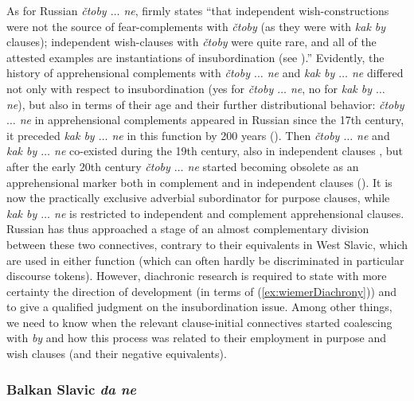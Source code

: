 \documentclass[output=paper,colorlinks,citecolor=brown]{langscibook}
\begin{document}
 As for Russian \textit{čtoby $\ldots$ ne}, \citet[142--143]{dobrushina2021} firmly states ``that independent wish-constructions were not the source of fear-complements with \textit{čtoby} (as they were with \textit{kak by} clauses); independent wish-clauses with \textit{čtoby} were quite rare, and all of the attested examples are instantiations of insubordination (see \citealt[337--346]{Dobrushina2016}).'' Evidently, the history of apprehensional complements with \textit{čtoby $\ldots$ ne} and \textit{kak by $\ldots$  ne} differed not only with respect to insubordination (yes for \textit{čtoby $\ldots$  ne}, no for \textit{kak by $\ldots$ ne}), but also in terms of their age and their further distributional behavior: \textit{čtoby $\ldots$  ne} in apprehensional complements appeared in Russian since the 17th century, it preceded \textit{kak by $\ldots$  ne} in this function by 200 years (\citealt[142--143]{dobrushina2021}). Then \textit{čtoby $\ldots$  ne} and \textit{kak by $\ldots$  ne} co-existed during the 19th century, also in independent clauses \citep[341]{Dobrushina2016}, but after the early 20th century \textit{čtoby $\ldots$  ne} started becoming obsolete as an apprehensional marker both in complement and in independent clauses (\citealt[58--60]{Nilsson2012}). It is now the practically exclusive adverbial subordinator for purpose clauses, while \textit{kak by $\ldots$  ne} is restricted to independent and complement apprehensional clauses. Russian has thus approached a stage of an almost complementary division between these two connectives, contrary to their equivalents in West Slavic, which are used in either function (which can often hardly be discriminated in particular discourse tokens). However, diachronic research is required to state with more certainty the direction of development (in terms of (\ref{ex:wiemerDiachrony})) and to give a qualified judgment on the insubordination issue. Among other things, we need to know when the relevant clause-initial connectives started coalescing with \textit{by} and how this process was related to their employment in purpose and wish clauses (and their negative equivalents).


\subsubsection{Balkan Slavic \textit{da ne}}
\label{subsubsec:balkanslavic}
\end{document}

